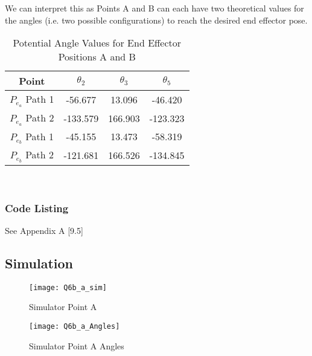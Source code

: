 	We can interpret this as Points A and B can each have two theoretical values for the angles (i.e. two possible configurations) to reach the desired end effector pose.
	
	\noindent
	\begin{table}[position = here]
		\begin{centering}
			\begin{tabular}{||c|c|c|c||}
				\hline \rule[-2ex]{0pt}{5.5ex} \color{red}\bf{Point} & \color{red}\bf{$\theta_{2}$}		&	\color{red}\bf{$\theta_{3}$}	&	\color{red}\bf{$\theta_{5}$}\\ 
				\hline \rule[-2ex]{0pt}{5.5ex} $P_{e_{a}}$ Path 1 & -56.677	&	13.096		&	-46.420\\
				\hline \rule[-2ex]{0pt}{5.5ex} $P_{e_{a}}$ Path 2 & -133.579	&	166.903	&	-123.323\\
				\hline \rule[-2ex]{0pt}{5.5ex} $P_{e_{b}}$ Path 1 & -45.155	&	13.473	&	-58.319\\
				\hline \rule[-2ex]{0pt}{5.5ex} $P_{e_{b}}$ Path 2 & -121.681	&	166.526&	-134.845\\
				\hline 
			\end{tabular}\\
		\end{centering}
		\begin{flushleft}
			\caption [Angles] {Potential Angle Values for End Effector Positions A and B}
		\end{flushleft}
	\end{table}
	\subsubsection{Code Listing}
		See Appendix A [9.5]
		
	\subsection{Simulation}

	\begin{figure}[position = here]
		\begin{centering}
			\texttt{[image: Q6b\_a\_sim]}\\
			\caption [SIMA1]{Simulator Point A}
		\end{centering}
	\end{figure}

	\begin{figure}[position = here]
		\begin{centering}
			\texttt{[image: Q6b\_a\_Angles]}\\
			\caption [SIMA1]{Simulator Point A Angles}
		\end{centering}
	\end{figure}

